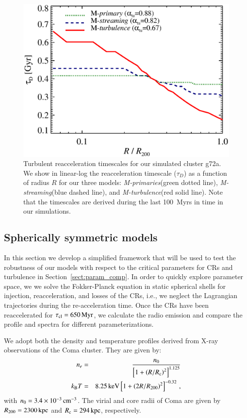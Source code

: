 \documentclass[fleqn,usenatbib,useAMS]{mnras}
\newcommand{\Mstream}{{\it M-streaming}\xspace}
\newcommand{\Mflatturb}{{\it M-turbulence}\xspace}
\newcommand{\Mprimary}{{\it M-primaries}\xspace}
\begin{document}
\begin{figure}
  \includegraphics[width=1.0\columnwidth]{tau_reacc.eps}
  \caption{Turbulent reacceleration timescales for our simulated
    cluster g72a. We show in linear-log the reacceleration timescale
    ($\tau_D$) as a function of radius $R$ for our three models:
    \Mprimary (green dotted line), \Mstream (blue dashed line), and
    \Mflatturb (red solid line). Note that the timescales are derived
    during the last 100~Myrs in time in our simulations.}
  \label{fig:tauD}
\end{figure}


\subsection{Spherically symmetric models}
In this section we develop a simplified framework that will be used to
test the robustness of our models with respect to the critical
parameters for CRs and turbulence in Section~\ref{sect:param_comp}. In
order to quickly explore parameter space, we we solve the
Fokker-Planck equation in static spherical shells for injection,
reacceleration, and losses of the CRs, i.e., we neglect the Lagrangian
trajectories during the re-acceleration time.  Once the CRs have been
reaccelerated for $\tau_{\mathrm{cl}} = 650\,{\mathrm{Myr}}$, we calculate the
radio emission and compare the profile and spectra for different
parameterizations.

We adopt both the density \citep{1992A&A...259L..31B} and temperature
profiles \citep{2009ApJ...696.1886B,2001A&A...365L..67A} derived from
X-ray observations of the Coma cluster. They are given by:
\begin{eqnarray}
n_e &=& \frac{n_0}{\left[1+\left(R/R_{{\mathrm{c}}}\right)^2\right]^{1.125}}\nonumber\\
k_{{\mathrm{B}}} T &=& 8.25\,{\mathrm{keV}} \left[1+\left(2R/R_{200}\right)^2\right]^{-0.32}\,,
\end{eqnarray}
with $n_0=3.4\times10^{-3}\,{\mathrm{cm}}^{-3}$.  The virial and core radii
of Coma are given by $R_{200} = 2300\,{\mathrm{kpc}}$ and $R_{{\mathrm{c}}} =
294\,{\mathrm{kpc}}$, respectively.
\end{document}
